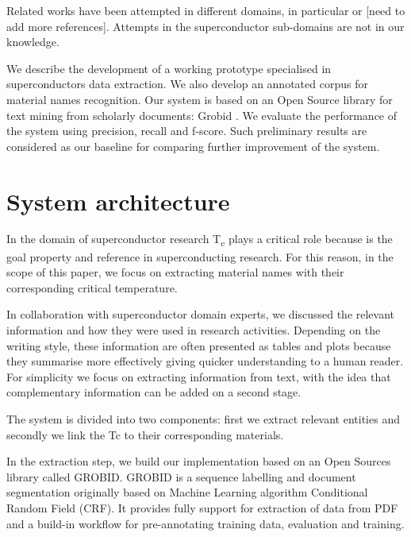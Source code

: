 \documentclass{article}
\begin{document}
Related works have been attempted in different domains, in particular  \cite{court2018auto} or [need to add more references]. Attempts in the superconductor sub-domains are not in our knowledge.  

We describe the development of a working prototype specialised in superconductors data extraction. We also develop an annotated corpus for material names recognition. Our system is based on an Open Source library for text mining from scholarly documents: Grobid \cite{GROBID} \cite{lopez2009grobid}. We evaluate the performance of the system using precision, recall and f-score. Such preliminary results are considered as our baseline for comparing further improvement of the system. 


\section{System architecture}
\label{sec:architecture}
In the domain of superconductor research T\textsubscript{c} plays a critical role because is the goal property and reference in superconducting research. For this reason, in the scope of this paper, we focus on extracting material names with their corresponding critical temperature. 

In collaboration with superconductor domain experts, we discussed the relevant information and how they were used in research activities. Depending on the writing style, these information are often presented as tables and plots because they summarise more effectively giving quicker understanding to a human reader. 
For simplicity we focus on extracting information from text, with the idea that complementary information can be added on a second stage. 

The system is divided into two components: first we extract relevant entities and secondly we link the Tc to their corresponding materials. 


In the extraction step, we build our implementation based on an Open Sources library called GROBID\cite{GROBID}. GROBID is a sequence labelling and document segmentation originally based on Machine Learning algorithm Conditional Random Field (CRF). It provides fully support for extraction of data from PDF and a build-in workflow for pre-annotating training data, evaluation and training. 
\end{document}
